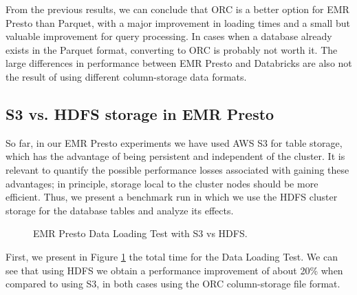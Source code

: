 From the previous results, we can conclude that ORC is a better option for EMR Presto than Parquet, with a major improvement in loading times and a small but valuable improvement for query processing. In cases when a database already exists in the Parquet format, converting to ORC is probably not worth it. The large differences in performance between EMR Presto and Databricks are also not the result of using different column-storage data formats.

\subsection{S3 vs. HDFS storage in EMR Presto}

So far, in our EMR Presto experiments we have used AWS S3 for table storage, which has the advantage of being persistent and independent of the cluster. It is relevant to quantify the possible performance losses associated with gaining these advantages; in principle, storage local to the cluster nodes should be more efficient. Thus, we present a benchmark run in which we use the HDFS cluster storage for the database tables and analyze its effects.

\begin{figure}
   \begin{center}
   \end{center}
   \caption{EMR Presto Data Loading Test with S3 vs HDFS.}
   \label{fig:additionalResultsPrestoHDFSvsS3DataLoading}
\end{figure}

First, we present in Figure \ref{fig:additionalResultsPrestoHDFSvsS3DataLoading} the total time for the Data Loading Test. We can see that using HDFS we obtain a performance improvement of about 20\% when compared to using S3, in both cases using the ORC column-storage file format.

